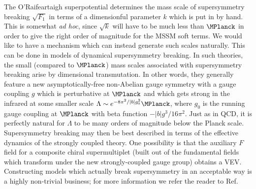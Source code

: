 The O'Rai\-f\-ear\-taigh superpotential determines the mass scale of
supersymmetry breaking $\sqrt{F_1}$ in terms of a dimensionful
parameter $k$ which is put in by hand. This is somewhat {\it ad hoc},
since $\sqrt{k}$ will have to be much less than
$\MPlanck$ in
order to give the right order of magnitude for the MSSM soft terms.
We would like to
have a mechanism which can instead 
generate such scales naturally. This can be
done in models of dynamical supersymmetry breaking. In such theories, the
small (compared to $\MPlanck$) mass scales associated with supersymmetry
breaking arise by dimensional transmutation. In other words, they
generally feature
a new asymptotically-free non-Abelian gauge symmetry with a gauge
coupling $g$ which is perturbative at $\MPlanck$ and which gets
strong in the infrared at some smaller scale
$\Lambda \sim
e^{-8\pi^2/|b| g_0^2} \MPlanck$,
where
$g_0$ is the running gauge coupling at $\MPlanck$
with beta function $- |b| g^3/16 \pi^2$.
Just as in QCD, it is perfectly natural for $\Lambda$ to be
many orders of magnitude below the Planck scale.
Supersymmetry breaking may then be best described in terms of the
effective dynamics of the
strongly coupled theory. One possibility is
that the auxiliary $F$ field for a composite chiral
supermultiplet (built out of the fundamental fields which transform
under the new strongly-coupled gauge group) obtains
a VEV.  Constructing models which actually break
supersymmetry in an acceptable way is a highly non-trivial
business; for more information we refer the
reader to Ref.\cite{dynamicalsusybreaking}

